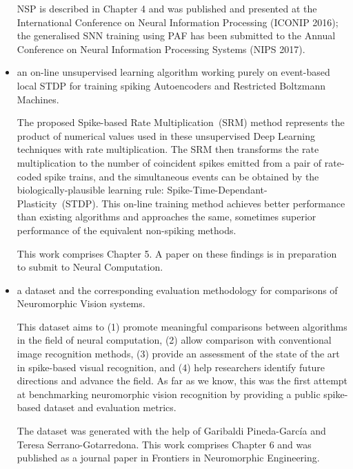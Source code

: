\begin{itemize}
	NSP is described in Chapter 4 and was published and presented at the International Conference on Neural Information Processing (ICONIP 2016);
	the generalised SNN training using PAF has been submitted to the Annual Conference on Neural Information Processing Systems (NIPS 2017).

	\item 
	an on-line unsupervised learning algorithm working purely on event-based local STDP for training spiking Autoencoders and Restricted Boltzmann Machines.
	
	The proposed Spike-based Rate Multiplication~(SRM) method represents the product of numerical values used in these unsupervised Deep Learning techniques with rate multiplication.
	The SRM then transforms the rate multiplication to the number of coincident spikes emitted from a pair of rate-coded spike trains, and the simultaneous events can be obtained by the biologically-plausible learning rule: Spike-Time-Dependant-Plasticity~(STDP).
	This on-line training method achieves better performance than existing algorithms and approaches the same, sometimes superior performance of the equivalent non-spiking methods.
%	
	
	This work comprises Chapter 5.
	A paper on these findings is in preparation to submit to Neural Computation.
	
	\item 
	a dataset and the corresponding evaluation methodology for comparisons of Neuromorphic Vision systems.
	
	This dataset aims to (1) promote meaningful comparisons between algorithms in the field of neural computation, (2) allow comparison with conventional image recognition methods, (3) provide an assessment of the state of the art in spike-based visual recognition, and (4) help researchers identify future directions and advance the field.
	As far as we know, this was the first attempt at benchmarking neuromorphic vision recognition by providing a public spike-based dataset and evaluation metrics.
	
	The dataset was generated with the help of Garibaldi Pineda-Garc\'ia and Teresa Serrano-Gotarredona.
	This work comprises Chapter 6 and was published as a journal paper in Frontiers in Neuromorphic Engineering.
\end{itemize}

